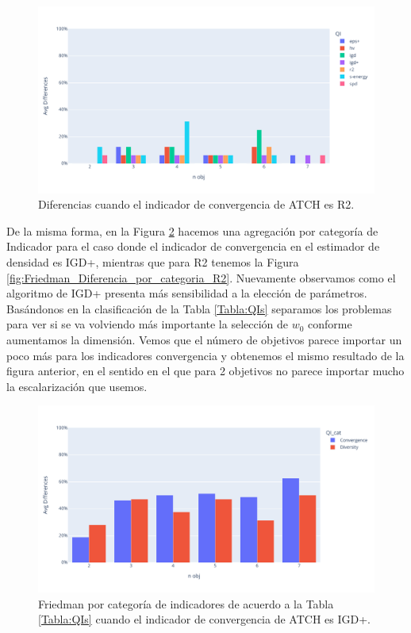 \begin{figure}[H]
    \centering
    \includegraphics[width=\textwidth]{Figuras/Friedman_obj_indconv_R2.pdf}
    \caption[Friedman R2]{Diferencias cuando el indicador de convergencia de ATCH es R2.}
    \label{fig:Fr_dim_R2}
\end{figure}


De la misma forma, en la Figura \ref{fig:Friedman_Diferencia_por_categoria_IGD} hacemos una agregación por categoría de Indicador para el caso donde el indicador de convergencia en el estimador de densidad es IGD+, mientras que para R2 tenemos la Figura \ref{fig:Friedman_Diferencia_por_categoria_R2}. Nuevamente observamos como el algoritmo de IGD+ presenta más sensibilidad a la elección de parámetros. Basándonos en la clasificación de la Tabla \ref{Tabla:QIs} separamos los problemas para ver si se va volviendo más importante la selección de $w_0$ conforme aumentamos la dimensión. Vemos que el número de objetivos parece importar un poco más para los indicadores convergencia y obtenemos el mismo resultado de la figura anterior, en el sentido en el que para 2 objetivos no parece importar mucho la escalarización que usemos.

\begin{figure}[H]
    \centering
    \includegraphics[width=\textwidth]{Figuras/Friedman_Diferencia_por_categoria_IGD+.pdf}
    \caption[Friedman por categoría para IGD+.]{Friedman por categoría de indicadores de acuerdo a la Tabla \ref{Tabla:QIs} cuando el indicador de convergencia de ATCH es IGD+.}
    \label{fig:Friedman_Diferencia_por_categoria_IGD}
\end{figure}

